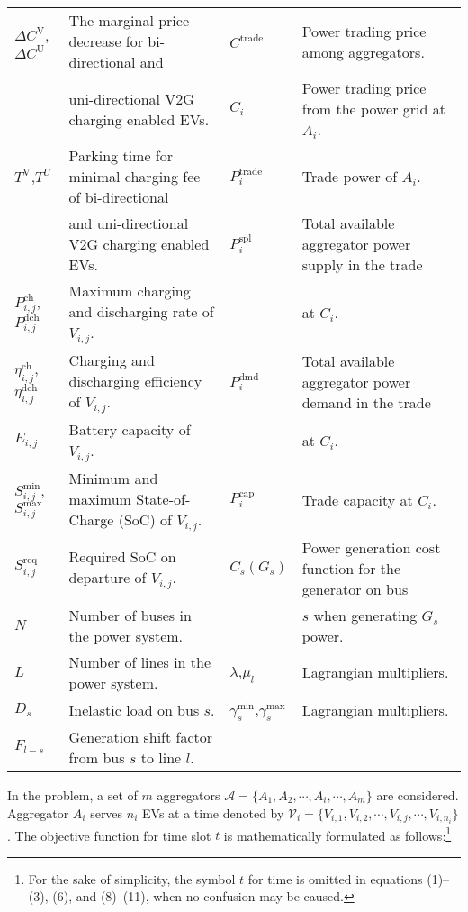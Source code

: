 \documentclass[conference]{IEEEtran}
\begin{document}
\begin{table*}
\begin{tabular}{l|l||l|l}
			$\Delta C^\text{V}$,$\Delta C^\text{U}$ & The marginal price decrease for bi-directional and & $C^\text{trade}$ & Power trading price among aggregators. \\
			& uni-directional V2G charging enabled EVs. & $C_i$ & Power trading price from the power grid at $A_i$. \\
			$T^\text{V}$,$T^\textit{U}$ & Parking time for minimal charging fee of bi-directional & $P^\text{trade}_i$ & Trade power of $A_i$. \\
			& and uni-directional V2G charging enabled EVs. & $P^\text{spl}_i$ & Total available aggregator power supply in the trade \\
			$P^\text{ch}_{i,j}$,$P^\text{dch}_{i,j}$ & Maximum charging and discharging rate of $V_{i,j}$. & & at $C_i$. \\
			$\eta^\text{ch}_{i,j}$,$\eta^\text{dch}_{i,j}$ & Charging and discharging efficiency of $V_{i,j}$. & $P^\text{dmd}_i$ & Total available aggregator power demand in the trade \\
			$E_{i,j}$ & Battery capacity of $V_{i,j}$. & & at $C_i$.\\
			$S^\text{min}_{i,j}$,$S^\text{max}_{i,j}$ & Minimum and maximum State-of-Charge (SoC) of $V_{i,j}$. & $P^\text{cap}_i$ & Trade capacity at $C_i$. \\
			$S^\text{req}_{i,j}$ & Required SoC on departure of $V_{i,j}$. & $C_s(G_s)$ & Power generation cost function for the generator on bus \\
			$N$ & Number of buses in the power system. & & $s$ when generating $G_s$ power. \\
			$L$ & Number of lines in the power system. & $\lambda$,$\mu_l$ & Lagrangian multipliers.\\
			$D_{s}$ & Inelastic load on bus $s$. & $\gamma^\text{min}_s$,$\gamma^\text{max}_s$ & Lagrangian multipliers.\\
			$F_{l-s}$ & Generation shift factor from bus $s$ to line $l$. & & \\
			
\hline
		\end{tabular}
	\end{table*}
	


	In the problem, a set of $m$ aggregators $\mathcal{A}=\{A_1, A_2, \cdots, A_i, \cdots, A_m\}$ are considered. Aggregator $A_i$ serves $n_i$ EVs at a time denoted by $\mathcal{V}_i=\{V_{i,1}, V_{i,2}, \cdots, V_{i,j}, \cdots, V_{i,n_i}\}$. The objective function for time slot $t$ is mathematically formulated as follows:\footnote{For the sake of simplicity, the symbol $t$ for time is omitted in equations (1)--(3), (6), and (8)--(11), when no confusion may be caused.}
    
\end{document}
